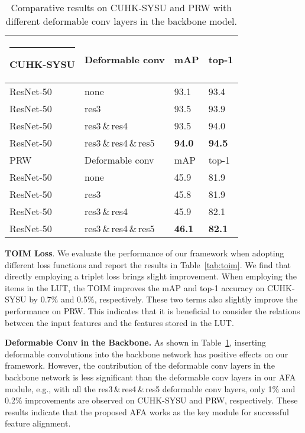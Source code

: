 \documentclass[journal]{IEEEtran}
\makeatletter
\newcommand{\thickhline}{\noalign {\ifnum 0=`}\fi \hrule height 1pt
    \futurelet \reserved@a \@xhline
}
\makeatother
\begin{document}
\begin{table}[t]
\small
\centering
\begin{tabular}{p{1.9cm}|p{2.7cm}|p{1.1cm}<{\centering}p{1.1cm}<{\centering}}
\hline\thickhline
\rowcolor{mygray} 
{CUHK-SYSU}  & Deformable conv   &  mAP  &  top-1  \\  \hline \hline     
ResNet-50
   & none       & 93.1   & 93.4  \\
ResNet-50
   & res3      & 93.5   & 93.9  \\
ResNet-50
   & res3{\,}\&{\,}res4      & 93.5   & 94.0  \\
ResNet-50
   & res3{\,}\&{\,}res4{\,}\&{\,}res5     &\textbf{94.0} & \textbf{94.5} \\
\hline \hline
\rowcolor{mygray} 
{PRW}  & Deformable conv   &  mAP  &  top-1  \\  \hline \hline     
ResNet-50
   & none       & 45.9   & 81.9  \\
ResNet-50
   & res3      & 45.8  & 81.9  \\
ResNet-50
   & res3{\,}\&{\,}res4      & 45.9   & 82.1  \\
ResNet-50
   & res3{\,}\&{\,}res4{\,}\&{\,}res5     &\textbf{46.1} & \textbf{82.1} \\
\hline
\end{tabular}
\caption{Comparative results on CUHK-SYSU and PRW with different deformable conv layers in the backbone model. }
\label{tab:dcn}
\end{table}

\textbf{TOIM Loss}.
We evaluate the performance of our framework when adopting different loss functions and report the results in Table~\ref{tab:toim}. We find that directly employing a triplet loss brings slight improvement. When employing the items in the LUT, the TOIM improves the mAP and top-1 accuracy on CUHK-SYSU by 0.7\% and 0.5\%, respectively. These two terms also slightly improve the performance on PRW. This indicates that it is beneficial to consider the relations between the input features and the features stored in the LUT.



\textbf{Deformable Conv in the Backbone.}
As shown in Table~\ref{tab:dcn}, inserting deformable convolutions into the backbone network has positive effects on our framework. However, the contribution of the deformable conv layers in the backbone network is less significant than the deformable conv layers in our AFA module, e.g., with all the res3{\,}\&{\,}res4{\,}\&{\,}res5 deformable conv layers, only 1\% and 0.2\% improvements are observed on CUHK-SYSU and PRW, respectively. These results indicate that the proposed AFA works as the key module for successful feature alignment.
\end{document}
